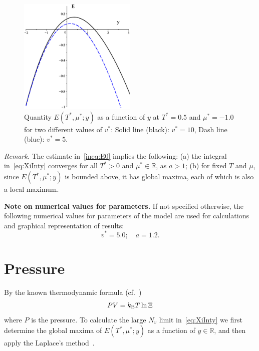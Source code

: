 \documentclass[12pt]{article}
\numberwithin{equation}{section}
\begin{document}
	\begin{figure}[htbp]
		\includegraphics[width=0.5\textwidth,angle=0]{images/E0_vs_y2}
		\centering
		\captionsetup{width=0.6\textwidth}
		\caption{Quantity $E(T^*,\mu^*;y)$ as a function of $y$ at $T^*=0.5$ and $\mu^*=-1.0$ for two different values of $v^*$: Solid line (black): $v^* = 10$, Dash line (blue): $v^* = 5$.}
		\label{fig:E0_vs_y}
	\end{figure}
	
	\textit{Remark}. The estimate in~\eqref{ineq:E0} implies the following: (a) the integral in~\eqref{eq:XiInty} converges for all $T^*>0$ and $\mu^* \in \mathbb{R}$, as $a>1$; (b) for fixed $T$ and $\mu$, since $E(T^*,\mu^*;y)$ is bounded above, it has global maxima, each of which is also a local maximum.
	
	\textbf{Note on numerical values for parameters.} If not specified otherwise, the following numerical values for parameters of the model are used for calculations and graphical representation of results:
	\begin{equation}
		v^* = 5.0; \quad a = 1.2.
	\end{equation}
	
	
	\section{Pressure}
	\label{sec:pres}
	By the known thermodynamic formula (cf.~\cite[(2.16)]{KKD20})
	\begin{equation}
		\label{def:eos}
		P V = k_{\rm B} T \ln \Xi
	\end{equation}
	where $P$ is the pressure. To calculate the large $N_v$ limit in~\eqref{eq:XiInty} we first determine the global maxima of $E(T^*,\mu^*;y)$ as a function of $y \in \mathbb{R}$, and then apply the Laplace's method~\cite{Fedoryuk89,BenderOrszag99}.
	
\end{document}
